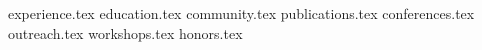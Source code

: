 \documentclass[11pt, a4paper]{awesome-cv}
\newcommand*{\sectiondir}{resume/}
\begin{document}
\makecvheader

{experience.tex}
{education.tex}
{community.tex}
{publications.tex}
{conferences.tex}
{outreach.tex}
{workshops.tex}
\needspace{10.5cm}
{honors.tex}
\end{document}
